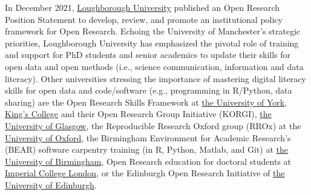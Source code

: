\documentclass[
]{book}
\theoremstyle{definition}
\theoremstyle{definition}
\theoremstyle{definition}
\theoremstyle{definition}
\theoremstyle{remark}
\begin{document}
In December 2021, \href{https://repository.lboro.ac.uk/articles/online_resource/Loughborough_University_Open_Research_Position_Statement/11709975}{Loughborough University} published an Open Research Position Statement to develop, review, and promote an institutional policy framework for Open Research. Echoing the University of Manchester's strategic priorities, Loughborough University has emphasized the pivotal role of training and support for PhD students and senior academics to update their skills for open data and open methods (i.e., science communication, information and data literacy). Other universities stressing the importance of mastering digital literacy skills for open data and code/software (e.g., programming in R/Python, data sharing) are the Open Research Skills Framework at \href{https://subjectguides.york.ac.uk/openresearch}{the University of York}, \href{https://www.kcl.ac.uk/research/kings-open-research-group-initiative-korgi}{King's College} and their Open Research Group Initiative (KORGI), \href{https://www.gla.ac.uk/myglasgow/openresearch/}{the University of Glasgow}, the Reproducible Research Oxford group (RROx) at the \href{https://www.ox.ac.uk/research/support-researchers/open-research}{University of Oxford}, the Birmingham Environment for Academic Research's (BEAR) software carpentry training (in R, Python, Matlab, and Git) at \href{https://intranet.birmingham.ac.uk/it/teams/infrastructure/research/bear/index.aspx}{the University of Birmingham}, Open Research education for doctoral students at \href{https://www.imperial.ac.uk/research-and-innovation/support-for-staff/scholarly-communication/open-research/open-research-education/}{Imperial College London}, or the Edinburgh Open Research Initiative of \href{https://www.ed.ac.uk/information-services/about/organisation/library-and-collections/open-research/eori}{the University of Edinburgh}.
\end{document}
